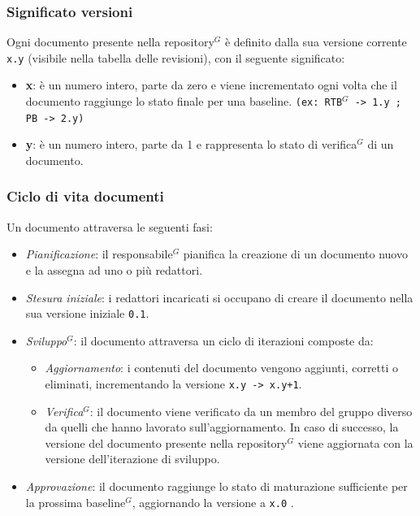 \documentclass[a4paper,10pt]{article}
\begin{document}
\subsubsection{Significato versioni}
Ogni documento presente nella repository$^G$ è definito dalla sua versione corrente \texttt{x.y} (visibile nella tabella delle revisioni),
con il seguente significato:
\begin{itemize}
  \item \textbf{x}: è un numero intero, parte da zero e viene incrementato ogni volta che il documento raggiunge lo stato finale per una baseline.
    \texttt{(ex: RTB$^G$ -> 1.y ; PB -> 2.y)}
  \item \textbf{y}: è un numero intero, parte da 1 e rappresenta lo stato di verifica$^G$ di un documento.
\end{itemize}

\subsubsection{Ciclo di vita documenti}
Un documento attraversa le seguenti fasi:
\begin{itemize}
  \item \textit{Pianificazione}: il responsabile$^G$ pianifica la creazione di un documento nuovo e la assegna ad uno o più redattori.
  \item \textit{Stesura iniziale}: i redattori incaricati si occupano di creare il documento nella sua versione iniziale \texttt{0.1}.
  \item \textit{Sviluppo$^G$}: il documento attraversa un ciclo di iterazioni composte da:
  \begin{itemize}
    \item \textit{Aggiornamento}: i contenuti del documento vengono aggiunti, corretti o eliminati, incrementando la versione \texttt{x.y -> x.y+1}.
    \item \textit{Verifica$^G$}: il documento viene verificato da un membro del gruppo diverso da quelli che hanno lavorato sull'aggiornamento. In caso di
      successo, la versione del documento presente nella repository$^G$ viene aggiornata con la versione dell'iterazione di sviluppo. 
  \end{itemize}
  \item \textit{Approvazione}: il documento raggiunge lo stato di maturazione sufficiente per la prossima baseline$^G$, aggiornando la versione a \texttt{x.0} .
\end{itemize}
\end{document}
